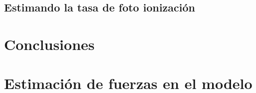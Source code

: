 \documentclass{book}
\begin{document}
\section{Estimando la tasa de foto ionización}

\chapter{Conclusiones}

\appendix
\chapter{Estimación de fuerzas en el modelo} \label{App:fuerzas}


\end{document}
